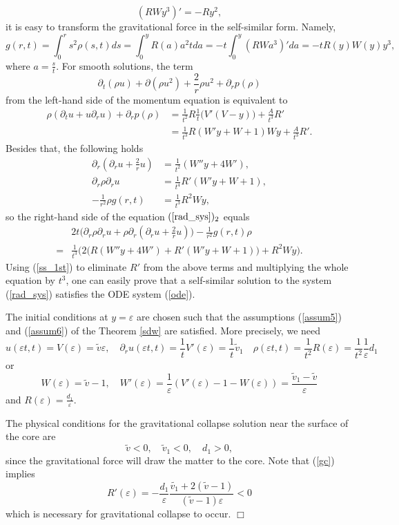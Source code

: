 \documentclass[reqno]{article}%
\theoremstyle{plain}
\theoremstyle{definition}
\theoremstyle{remark}
\numberwithin{equation}{section}
\begin{document}
\[(RWy^3)'=-Ry^2,\]
 it is easy to transform the gravitational force in the self-similar form. Namely, 
 \[g(r,t)=\int_0^r s^2\rho(s,t)ds=\int_0^y R(a)a^2tda=-t\int_0^y(RWa^3)'da=-tR(y)W(y)y^3,\]
 where $a=\frac{s}{t}$.
 For  smooth solutions, the term 
 \[\partial_t(\rho u)+\partial(\rho u^2)+\frac{2}{r}\rho u^2+\partial_r p(\rho)\]
 from the left-hand side of the momentum equation is equivalent to
 \[\begin{split}
 \rho(\partial_t u+u \partial_r u)+\partial_r p(\rho)&=\frac{1}{t^2}R\frac{1}{t}\big(V'(V-y)\big)+\frac{A}{t^3}R'\\
 &=\frac{1}{t^3}R(W'y+W+1)Wy+\frac{A}{t^3}R'.
 \end{split}\]
 Besides that, the following holds
 \[\begin{split}
 \partial_r(\partial_r u+\frac{2}{r}u)&=\frac{1}{t^2}(W''y+4W'),\\
 \partial_r \rho \partial_r u&=\frac{1}{t^4}R'(W'y+W+1),\\
 -\frac{1}{r^2}\rho g(r,t)&=\frac{1}{t^3}R^2Wy,
 \end{split}\]
 so the right-hand side of the equation $(\ref{rad_sys})_2$ equals
 \[\begin{split}
& 2t \Big(\partial_r \rho \partial_r u+\rho\partial_r(\partial_r u+\frac{2}{r}u)\Big)-\frac{1}{r^2}g(r,t)\rho\\
=& \frac{1}{t^3}\Big(2\big(R(W''y+4W')+R'(W'y+W+1)\big)+R^2Wy\Big).
 \end{split}\]
 Using (\ref{ss_1st}) to eliminate $R'$ from the above terms and multiplying the whole equation by $t^3$, one can easily prove that a self-similar solution to the system (\ref{rad_sys}) satisfies the ODE system (\ref{ode}).

The initial conditions at $y=\varepsilon$ are chosen such that the assumptions (\ref{assum5}) and (\ref{assum6}) of the Theorem \ref{sdw} are satisfied. More precisely, we need
\[u(\varepsilon t,t)=V(\varepsilon)=\tilde{v} \varepsilon, \quad \partial_r u(\varepsilon t,t)=\frac{1}{t}V'(\varepsilon)=\frac{1}{t}\tilde{v}_1\quad \rho(\varepsilon t,t)=\frac{1}{t^2}R(\varepsilon)=\frac{1}{t^2}\frac{1}{\varepsilon}d_1\]
or
\[W(\varepsilon)=\tilde{v}-1, \quad W'(\varepsilon)=\frac{1}{\varepsilon}(V'(\varepsilon)-1-W(\varepsilon))=\frac{\tilde{v}_1-\tilde{v}}{\varepsilon}\]
and $R(\varepsilon)=\frac{d_1}{\varepsilon}.$

The physical conditions for the gravitational collapse solution  near the surface of the core are
\begin{equation}\label{gc}
\tilde{v}<0, \quad\tilde{v}_1<0,\quad d_1>0,
\end{equation}
since the gravitational force will draw the matter to the core.
Note that (\ref{gc}) implies 
\[R'(\varepsilon)=-\frac{d_1}{\varepsilon}\frac{\tilde{v_1}+2(\tilde{v}-1)}{(\tilde{v}-1)\varepsilon}<0\]
which is necessary for gravitational collapse to occur.  %
\hfill $\Box$
\end{document}
